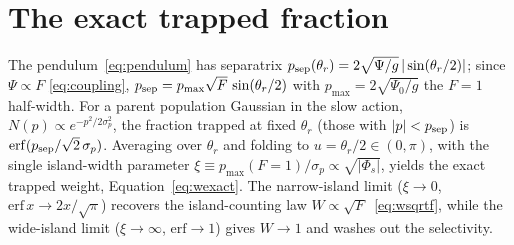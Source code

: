 \documentclass[twocolumn]{aastex701}
\begin{document}
\section{The exact trapped fraction}
\label{app:trapped}

The pendulum~\eqref{eq:pendulum} has separatrix
$p_{\rm sep}(\theta_r)=2\sqrt{\Psi/g}\,|\sin(\theta_r/2)|$; since $\Psi\propto F$
\eqref{eq:coupling}, $p_{\rm sep}=p_{\max}\sqrt{F}\,\sin(\theta_r/2)$ with
$p_{\max}=2\sqrt{\Psi_0/g}$ the $F{=}1$ half-width. For a parent population Gaussian in
the slow action, $N(p)\propto e^{-p^2/2\sigma_p^2}$, the fraction trapped at fixed
$\theta_r$ (those with $|p|<p_{\rm sep}$) is $\mathrm{erf}(p_{\rm sep}/\sqrt2\,\sigma_p)$.
Averaging over $\theta_r$ and folding to $u=\theta_r/2\in(0,\pi)$, with the single
island-width parameter $\xi\equiv p_{\max}(F{=}1)/\sigma_p\propto\sqrt{|\Phi_s|}$,
yields the exact trapped weight, Equation~\eqref{eq:wexact}. The narrow-island limit
($\xi\to0$, $\mathrm{erf}\,x\to2x/\sqrt\pi$) recovers the island-counting law
$W\propto\sqrt{F}$~\eqref{eq:wsqrtf}, while the wide-island limit ($\xi\to\infty$,
$\mathrm{erf}\to1$) gives $W\to1$ and washes out the selectivity.



\end{document}
